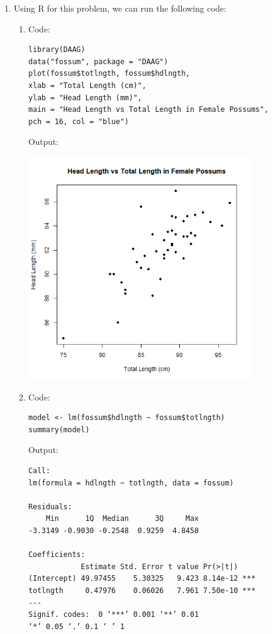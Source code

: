 \documentclass[12pt]{article}
\begin{document}
\begin{enumerate}[1.]
        \item Using R for this problem, we can run the following code:
            \begin{enumerate}
                \item Code: \begin{verbatim}
library(DAAG)
data("fossum", package = "DAAG")
plot(fossum$totlngth, fossum$hdlngth, 
xlab = "Total Length (cm)", 
ylab = "Head Length (mm)", 
main = "Head Length vs Total Length in Female Possums",
pch = 16, col = "blue")
                \end{verbatim}
                Output:
                \begin{center}
                    \includegraphics[width=0.8\textwidth]{Rplot04.png}
                \end{center}
                \item Code: \begin{verbatim}
model <- lm(fossum$hdlngth ~ fossum$totlngth)
summary(model)
                \end{verbatim}
                Output:
                \begin{verbatim}
Call:
lm(formula = hdlngth ~ totlngth, data = fossum)

Residuals:
    Min      1Q  Median      3Q     Max 
-3.3149 -0.9030 -0.2548  0.9259  4.8458 

Coefficients:
            Estimate Std. Error t value Pr(>|t|)    
(Intercept) 49.97455    5.30325   9.423 8.14e-12 ***
totlngth     0.47976    0.06026   7.961 7.50e-10 ***
---
Signif. codes:  0 ‘***’ 0.001 ‘**’ 0.01
‘*’ 0.05 ‘.’ 0.1 ‘ ’ 1


\end{verbatim}
\end{enumerate}
\end{enumerate}
\end{document}
